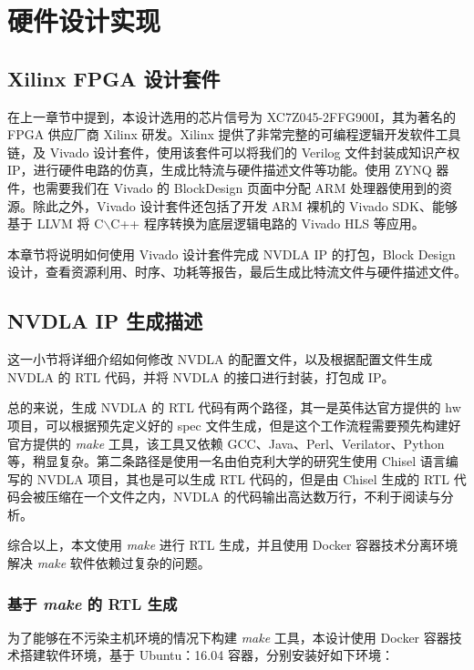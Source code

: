 \chapter{硬件设计实现}\label{chap:hardware}


\section{Xilinx FPGA 设计套件}

在上一章节中提到，本设计选用的芯片信号为 XC7Z045-2FFG900I，其为著名的 FPGA 供应厂商 Xilinx 研发。Xilinx 提供了非常完整的可编程逻辑开发软件工具链，及 Vivado 设计套件，使用该套件可以将我们的 Verilog 文件封装成知识产权 IP，进行硬件电路的仿真，生成比特流与硬件描述文件等功能。使用 ZYNQ 器件，也需要我们在 Vivado 的 BlockDesign 页面中分配 ARM 处理器使用到的资源。除此之外，Vivado 设计套件还包括了开发 ARM 裸机的 Vivado SDK、能够基于 LLVM 将 C$\backslash$C++ 程序转换为底层逻辑电路的 Vivado HLS 等应用。

本章节将说明如何使用 Vivado 设计套件完成 NVDLA IP 的打包，Block Design 设计，查看资源利用、时序、功耗等报告，最后生成比特流文件与硬件描述文件。 

\section{NVDLA IP 生成描述}

这一小节将详细介绍如何修改 NVDLA 的配置文件，以及根据配置文件生成 NVDLA 的 RTL 代码，并将 NVDLA 的接口进行封装，打包成 IP。

总的来说，生成 NVDLA 的 RTL 代码有两个路径，其一是英伟达官方提供的 hw 项目，可以根据预先定义好的 spec 文件生成，但是这个工作流程需要预先构建好官方提供的 \emph{make} 工具，该工具又依赖 GCC、Java、Perl、Verilator、Python 等，稍显复杂。第二条路径是使用一名由伯克利大学的研究生使用 Chisel 语言编写的 NVDLA 项目，其也是可以生成 RTL 代码的，但是由 Chisel 生成的 RTL 代码会被压缩在一个文件之内，NVDLA 的代码输出高达数万行，不利于阅读与分析。

综合以上，本文使用 \emph{make} 进行 RTL 生成，并且使用 Docker 容器技术分离环境解决 \emph{make} 软件依赖过复杂的问题。

\subsection{基于 \emph{make} 的 RTL 生成}

为了能够在不污染主机环境的情况下构建 \emph{make} 工具，本设计使用 Docker 容器技术搭建软件环境，基于 Ubuntu：16.04 容器，分别安装好如下环境：

